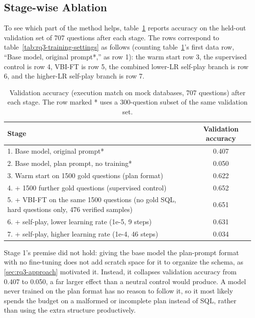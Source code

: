 \subsection{Stage-wise Ablation}
\label{sec:rq3-ablation}

To see which part of the method helps, table~\ref{tab:rq3-validation-accuracy-06b} reports accuracy on the held-out validation set of 707 questions after each stage. The rows correspond to table~\ref{tab:rq3-training-settings} as follows (counting table~\ref{tab:rq3-validation-accuracy-06b}'s first data row, ``Base model, original prompt*,'' as row 1): the warm start row 3, the supervised control is row 4, VBI-FT is row 5, the combined lower-LR self-play branch is row 6, and the higher-LR self-play branch is row 7.

\begin{table}[H]
\centering
\footnotesize
\caption{Validation accuracy (execution match on mock databases, 707 questions) after each stage. The row marked * uses a 300-question subset of the same validation set.}
\label{tab:rq3-validation-accuracy-06b}
\begin{tabular}{lc}
\toprule
Stage & Validation accuracy \\
\midrule
1. Base model, original prompt* & 0.407 \\
2. Base model, plan prompt, no training* & 0.050 \\
3. Warm start on 1500 gold questions (plan format) & 0.622 \\
4. + 1500 further gold questions (supervised control) & 0.652 \\
5. + VBI-FT on the same 1500 questions (no gold SQL, hard questions only, 476 verified samples) & 0.651 \\
6. + self-play, lower learning rate (1e-5, 9 steps) & 0.631 \\
7. + self-play, higher learning rate (1e-4, 46 steps) & 0.034 \\
\bottomrule
\end{tabular}
\end{table}

Stage 1's premise did not hold: giving the base model the plan-prompt format with no fine-tuning does not add scratch space for it to organize the schema, as \ref{sec:rq3-approach} motivated it. Instead, it collapses validation accuracy from 0.407 to 0.050, a far larger effect than a neutral control would produce. A model never trained on the plan format has no reason to follow it, so it most likely spends the budget on a malformed or incomplete plan instead of SQL, rather than using the extra structure productively. 

